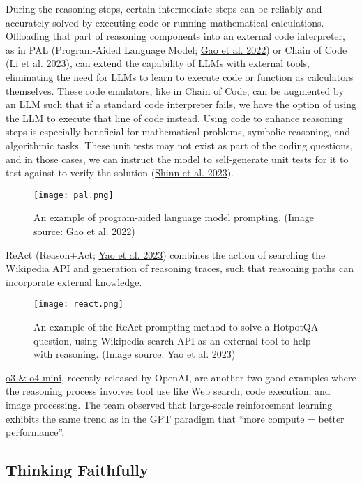 \documentclass[12pt]{article}
\begin{document}
During the reasoning steps, certain intermediate steps can be reliably and accurately solved by executing code or running mathematical calculations. Offloading that part of reasoning components into an external code interpreter, as in PAL (Program-Aided Language Model; \href{https://arxiv.org/abs/2211.10435}{Gao et al. 2022}) or Chain of Code (\href{https://chain-of-code.github.io/}{Li et al. 2023}), can extend the capability of LLMs with external tools, eliminating the need for LLMs to learn to execute code or function as calculators themselves. These code emulators, like in Chain of Code, can be augmented by an LLM such that if a standard code interpreter fails, we have the option of using the LLM to execute that line of code instead. Using code to enhance reasoning steps is especially beneficial for mathematical problems, symbolic reasoning, and algorithmic tasks. These unit tests may not exist as part of the coding questions, and in those cases, we can instruct the model to self-generate unit tests for it to test against to verify the solution (\href{https://arxiv.org/abs/2303.11366}{Shinn et al. 2023}).

\begin{figure}[h]
    \centering
    \texttt{[image: pal.png]}
    \caption{An example of program-aided language model prompting. (Image source: Gao et al. 2022)}
\end{figure}

ReAct (Reason+Act; \href{https://arxiv.org/abs/2210.03629}{Yao et al. 2023}) combines the action of searching the Wikipedia API and generation of reasoning traces, such that reasoning paths can incorporate external knowledge.

\begin{figure}[h]
    \centering
    \texttt{[image: react.png]}
    \caption{An example of the ReAct prompting method to solve a HotpotQA question, using Wikipedia search API as an external tool to help with reasoning. (Image source: Yao et al. 2023)}
\end{figure}

\href{https://openai.com/index/introducing-o3-and-o4-mini/}{o3 \& o4-mini}, recently released by OpenAI, are another two good examples where the reasoning process involves tool use like Web search, code execution, and image processing. The team observed that large-scale reinforcement learning exhibits the same trend as in the GPT paradigm that ``more compute = better performance''.

\subsection{Thinking Faithfully}
\end{document}
